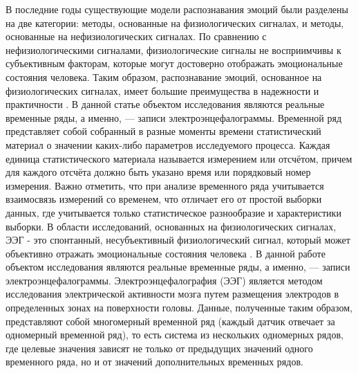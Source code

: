 \documentclass{article}
\begin{document}
В последние годы существующие модели распознавания эмоций были разделены на две категории: методы, основанные на физиологических сигналах, и методы, основанные на нефизиологических сигналах. По сравнению с нефизиологическими сигналами, физиологические сигналы не восприимчивы к субъективным факторам, которые могут достоверно отображать эмоциональные состояния человека. Таким образом, распознавание эмоций, основанное на физиологических сигналах, имеет большие преимущества в надежности и практичности \citep{sensors}. В данной статье объектом исследования являются реальные временные ряды, а именно, — записи электроэнцефалограммы. Временной ряд представляет собой собранный в разные моменты времени статистический материал о значении каких-либо параметров исследуемого процесса. Каждая единица статистического материала называется измерением или отсчётом, причем для каждого отсчёта должно быть указано время или порядковый номер измерения. Важно отметить, что при анализе временного ряда учитывается взаимосвязь измерений со временем, что отличает его от простой выборки данных, где учитывается только статистическое разнообразие и характеристики выборки. В области исследований, основанных на физиологических сигналах, ЭЭГ - это спонтанный, несубъективный физиологический сигнал, который может объективно отражать эмоциональные состояния человека \citep{eeg}. В данной работе объектом исследования являются реальные временные ряды, а именно, — записи электроэнцефалограммы. Электроэнцефалография (ЭЭГ) является методом исследования электрической активности мозга путем размещения электродов в определенных зонах на поверхности головы. Данные, полученные таким образом, представляют собой многомерный временной ряд (каждый датчик отвечает за одномерный временной ряд), то есть система из нескольких одномерных рядов, где целевые значения зависят не только от предыдущих значений одного временного ряда, но и от значений дополнительных временных рядов.
\end{document}
